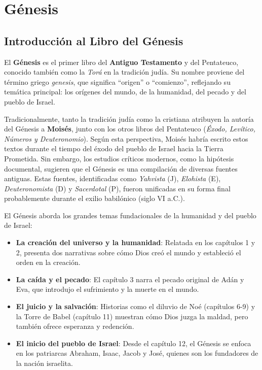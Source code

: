 
\chapter{Génesis}

\section*{Introducción al Libro del Génesis}

El \textbf{Génesis} es el primer libro del \textbf{Antiguo Testamento} y del Pentateuco, conocido también como la \textit{Torá} en la tradición judía. Su nombre proviene del término griego \textit{genesis}, que significa  ``origen''  o ``comienzo'', reflejando su temática principal: los orígenes del mundo, de la humanidad, del pecado y del pueblo de Israel.


Tradicionalmente, tanto la tradición judía como la cristiana atribuyen la autoría del Génesis a \textbf{Moisés}, junto con los otros libros del Pentateuco (\textit{Éxodo, Levítico, Números y Deuteronomio}). Según esta perspectiva, Moisés habría escrito estos textos durante el tiempo del éxodo del pueblo de Israel hacia la Tierra Prometida. Sin embargo, los estudios críticos modernos, como la hipótesis documental, sugieren que el Génesis es una compilación de diversas fuentes antiguas. Estas fuentes, identificadas como \textit{Yahvista} (J), \textit{Elohista} (E), \textit{Deuteronomista} (D) y \textit{Sacerdotal} (P), fueron unificadas en su forma final probablemente durante el exilio babilónico (siglo VI a.C.).


El Génesis aborda los grandes temas fundacionales de la humanidad y del pueblo de Israel:
\begin{itemize}
	\item \textbf{La creación del universo y la humanidad}: Relatada en los capítulos 1 y 2, presenta dos narrativas sobre cómo Dios creó el mundo y estableció el orden en la creación.
	\item \textbf{La caída y el pecado}: El capítulo 3 narra el pecado original de Adán y Eva, que introdujo el sufrimiento y la muerte en el mundo.
	\item \textbf{El juicio y la salvación}: Historias como el diluvio de Noé (capítulos 6-9) y la Torre de Babel (capítulo 11) muestran cómo Dios juzga la maldad, pero también ofrece esperanza y redención.
	\item \textbf{El inicio del pueblo de Israel}: Desde el capítulo 12, el Génesis se enfoca en los patriarcas Abraham, Isaac, Jacob y José, quienes son los fundadores de la nación israelita.
\end{itemize}


